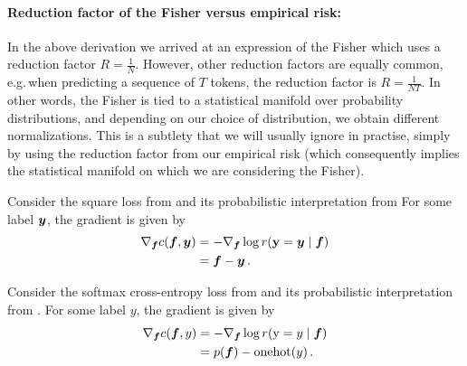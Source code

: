\paragraph{Reduction factor of the Fisher versus empirical risk:}
In the above derivation we arrived at an expression of the Fisher which uses a reduction factor $R = \frac{1}{N}$.
However, other reduction factors are equally common, e.g.\,when predicting a sequence of $T$ tokens, the reduction factor is $R = \frac{1}{NT}$.
In other words, the Fisher is tied to a statistical manifold over probability distributions, and depending on our choice of distribution, we obtain different normalizations.
This is a subtlety that we will usually ignore in practise, simply by using the reduction factor from our empirical risk (which consequently implies the statistical manifold on which we are considering the Fisher).


\begin{example}
  Consider the square loss from  and its probabilistic interpretation from 
  For some label ${\bm{y}}$, the gradient is given by
  \begin{align*}
    \nabla_{{\bm{f}}} c({\bm{f}}, {\bm{y}})
     & =
    - \nabla_{{\bm{f}}} \log r({\mathbf{y}} ={\bm{y}} \mid {\bm{f}})
    \\
     & =
    {\bm{f}} - {\bm{y}}\,.
  \end{align*}
\end{example}

\begin{example}
  Consider the softmax cross-entropy loss from  and its probabilistic interpretation from . For some label $y$, the gradient is given by
  \begin{align*}
    \nabla_{{\bm{f}}} c({\bm{f}}, y)
     & =
    - \nabla_{{\bm{f}}} \log r({\textnormal{y}} = y \mid {\bm{f}})
    \\
     & =
    p({\bm{f}}) - \mathrm{onehot}(y)\,.
  \end{align*}
\end{example}

